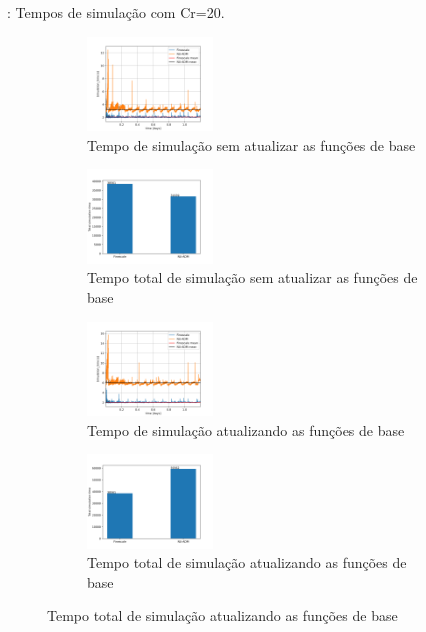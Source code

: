 \documentclass[professionalfont]{beamer}
\begin{document}
\begin{frame}{\FrameProblemName: {\small Tempos de simulação com Cr=20.}}
    \begin{figure}[!h]
        \centering
        \begin{subfigure}{.48\textwidth}
            \centering
            \includegraphics[height=2.5cm]{./imgs/pr2/3k_5000x1x1/cr 20/v2/no_update/svgtopng/figura_case-finescale_3k_5000_CR20_no__updateTempo de simulaçãoActive_volumes.png}
            \caption{Tempo de simulação sem atualizar as funções de base}
        \end{subfigure}
        \hfill
        \begin{subfigure}{.48\textwidth}
            \centering
            \includegraphics[height=2.5cm]{./imgs/pr2/3k_5000x1x1/cr 20/v2/no_update/svgtopng/figura_case-finescale_3k_5000_CR20_no__updateTotal_simulation_time.png}
            \caption{Tempo total de simulação sem atualizar as funções de base}
        \end{subfigure}
        \bigskip
        \begin{subfigure}[t]{.48\textwidth}
            \centering
            \includegraphics[height=2.5cm]{./imgs/pr2/3k_5000x1x1/cr 20/v2/update/svgtopng/figura_case-finescale_3k_5000_CR20_updateTempo de simulaçãoActive_volumes.png}
            \caption{Tempo de simulação atualizando as funções de base}
        \end{subfigure}
        \hfill
        \begin{subfigure}[t]{.48\textwidth}
            \centering
            \includegraphics[height=2.5cm]{./imgs/pr2/3k_5000x1x1/cr 20/v2/update/svgtopng/figura_case-finescale_3k_5000_CR20_updateTotal_simulation_time.png}
            \caption{Tempo total de simulação atualizando as funções de base}
        \end{subfigure}
    
        \label{fig:fig3_pr3-cr20}
    \end{figure}
\end{frame}
\end{document}
